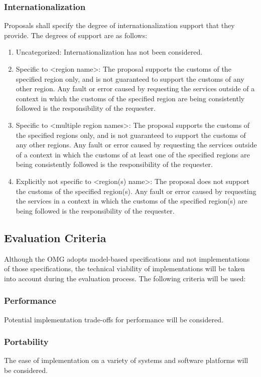 \subsubsection{Internationalization}
Proposals shall specify the degree of internationalization support that they provide. The degrees of support are as follows: 
\begin{enumerate}[label=\alph*)]
\item Uncategorized: Internationalization has not been considered. 
\item Specific to <region name>: The proposal supports the customs of the specified region only, and is not guaranteed to support the customs of any other region. Any fault or error caused by requesting the services outside of a context in which the customs of the specified region are being consistently followed is the responsibility of the requester.
\item Specific to <multiple region names>: The proposal supports the customs of the specified regions only, and is not guaranteed to support the customs of any other regions. Any fault or error caused by requesting the services outside of a context in which the customs of at least one of the specified regions are being consistently followed is the responsibility of the requester.
\item Explicitly not specific to <region(s) name>: The proposal does not support the customs of the specified region(s). Any fault or error caused by requesting the services in a context in which the customs of the specified region(s) are being followed is the responsibility of the requester.
\end{enumerate}
\subsection{Evaluation Criteria}
Although the OMG adopts model-based specifications and not implementations of those specifications, the technical viability of implementations will be taken into account during the evaluation process. The following criteria will be used:
\subsubsection{Performance}
Potential implementation trade-offs for performance will be considered. 
\subsubsection{Portability}
The ease of implementation on a variety of systems and software platforms will be considered.
